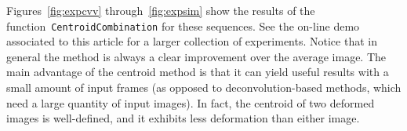 \documentclass{ipol}
\begin{document}
Figures~\ref{fig:expcvv} through~\ref{fig:expsim} show the results of the
function~\texttt{CentroidCombination} for these sequences.  See the on-line
demo associated to this article for a larger collection of experiments.
Notice that in general the method is always a clear improvement over the
average image.  The main advantage of the centroid method is that it can yield
useful results with a small amount of input frames (as opposed to
deconvolution-based methods, which need a large quantity of input images).  In
fact, the centroid of two deformed images is well-defined, and it exhibits
less deformation than either image.






\end{document}
